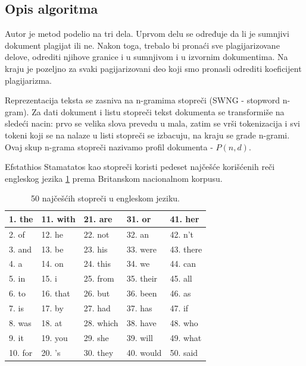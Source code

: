 \documentclass[a4paper]{article}
\begin{document}
\subsection{Opis algoritma}
\label{subsec:opis algoritma}

Autor je metod podelio na tri dela. Uprvom delu se određuje da li je sumnjivi  dokument plagijat ili ne. Nakon toga, trebalo bi pronaći sve plagijarizovane delove,  odrediti njihove granice i u sumnjivom i u izvornim dokumentima. Na kraju je pozeljno  za svaki  pagijarizovani deo koji smo pronasli odrediti koeficijent plagijarizma.\cite{stamatatos} 

\par Reprezentacija teksta se zasniva na n-gramima stopreči (SWNG - stopword n-gram). Za dati dokument i listu stopreči tekst dokumenta se transformiše na sledeći nacin: prvo se velika slova  prevedu u mala, zatim se vrši tokenizacija i svi tokeni koji se na nalaze u  listi stopreči se izbacuju, na kraju se grade n-grami. Ovaj skup n-grama stopreči nazivamo profil dokumenta - \(P(n,d)\). 

\par Efstathios Stamatatos kao stopreči koristi pedeset najčešće korišćenih reči engleskog jezika \ref{tab:tabela} prema Britanskom nacionalnom korpusu. 

\begin{table}[h!]
\begin{center}
\caption{50 najčešćih stopreči u engleskom jeziku.}
\begin{tabular}{|l|l|l|l|l|} \hline
1. the & 11. with & 21. are & 31. or & 41. her \\ \hline
2. of & 12. he & 22. not & 32. an & 42. n't \\ \hline
3. and & 13. be & 23. his & 33. were & 43. there \\ \hline
4. a & 14. on & 24. this & 34. we & 44. can \\ \hline
5. in & 15. i & 25. from & 35. their & 45. all \\ \hline
6. to & 16. that & 26. but & 36. been & 46. as \\ \hline
7. is & 17. by & 27. had & 37. has & 47. if \\ \hline
8. was & 18. at & 28. which & 38. have & 48. who \\ \hline
9. it & 19. you & 29. she & 39. will & 49. what \\ \hline
10. for & 20. 's & 30. they & 40. would & 50. said \\ \hline
\end{tabular}
\label{tab:tabela}
\end{center}
\end{table}
\end{document}
